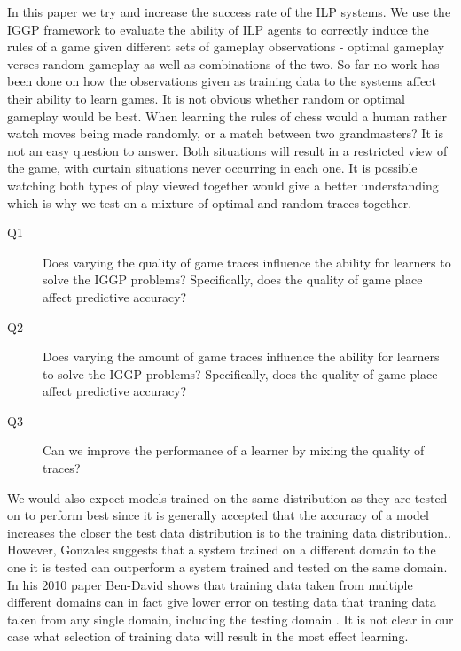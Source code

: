 
In this paper we try and increase the success rate of the ILP systems. We use the IGGP framework to evaluate the ability of ILP agents to correctly induce the rules of a game given different sets of gameplay observations - optimal gameplay verses random gameplay as well as combinations of the two. So far no work has been done on how the observations given as training data to the systems affect their ability to learn games. It is not obvious whether random or optimal gameplay would be best. When learning the rules of chess would a human rather watch moves being made randomly, or a match between two grandmasters? It is not an easy question to answer. Both situations will result in a restricted view of the game, with curtain situations never occurring in each one. It is possible watching both types of play viewed together would give a better understanding which is why we test on a mixture of optimal and random traces together.


\begin{description}
\item[Q1] Does varying the quality of game traces influence the ability for learners to solve the IGGP problems? Specifically, does the quality of game place affect predictive accuracy?
\item[Q2] Does varying the amount of game traces influence the ability for learners to solve the IGGP problems? Specifically, does the quality of game place affect predictive accuracy?
\item[Q3] Can we improve the performance of a learner by mixing the quality of traces?
\end{description}

We would also expect models trained on the same distribution as they are tested on to perform best since it is generally accepted that the accuracy of a model increases the closer the test data distribution is to the training data distribution.\cite{Mitchell/MachineLearing}. However, Gonzales \cite{Gonzalez/MismatchedOutperform} suggests that a system trained on a different domain to the one it is tested can outperform a system trained and tested on the same domain. In his 2010 paper Ben-David shows that training data taken from multiple different domains can in fact give lower error on testing data that traning data taken from any single domain, including the testing domain \cite{Ben-David/DifferentDomains}. It is not clear in our case what selection of training data will result in the most effect learning.

